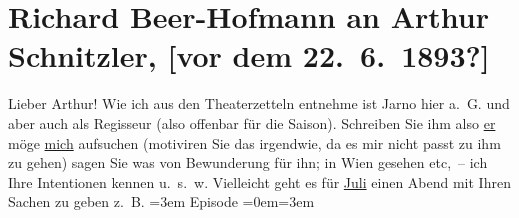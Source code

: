 

         
         \newcommand{\erwaehntePersonen}{Personen: Benedikt Felix, Josef Jarno}
         \newcommand{\erwaehnteOrte}{Orte: Bad Ischl, Wien}
         \newcommand{\erwaehnteWerke}{Werke: Abschiedssouper, Anatols Hochzeitsmorgen, Episode, Signor Formica. Komische Oper in drei Akten}
               \section[Richard Beer-Hofmann an Arthur Schnitzler, {[}vor dem 22. 6. 1893?{]}]{ Richard Beer-Hofmann an Arthur Schnitzler, {[}vor dem
               22. 6. 1893?{]}}\nopagebreak{}\rehead{ }\begin{ledgroupsized}[t]{13cm}\normalsize\beginnumbering \toendnotes[C]{\smallbreak\pagebreak[2]} 
\toendnotes[C]{\smallbreak}\pstart
           \noindent{}\textcolor{gray}{\textbf{\label{T_L00223-1v}\label{T_L00223-1h}}}\pend
           \pstart{}{\pb}Lieber Arthur!\pend\pstart
           Wie ich aus den Theaterzetteln entnehme ist Jarno
               hier a. G. und aber auch als Regisseur (also offenbar für die Saison). Schreiben Sie
               ihm also \uline{er} möge \uline{mich}
               aufsuchen (motiviren Sie das irgendwie, da es mir nicht passt zu ihm zu gehen) sagen
                  {\pb}Sie was von Bewunderung für
               ihn; in Wien gesehen etc, – ich Ihre Intentionen
               kennen u. s. w. Vielleicht geht es für \uline{Juli} einen Abend mit Ihren Sachen zu geben z. B.\pend
           \leftskip=3em{}\pstart
           \noindent{}Episode\pend
           \leftskip=0em{}\leftskip=3em{}\pstart

\end{ledgroupsized}
